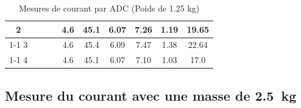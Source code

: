 \begin{table}[H]
{\begin{tabular}{|c|c|c|c|c|c|c|c|c|c|}
            2         &                                                            &                           &                                                                                        & 4.6                                                      & 45.1                                                    & 6.07                                                                & 7.26                                                  & 1.19   & 19.65                                                              \\ \cline{1-1} \cline{5-10}
            3         &                                                            &                           &                                                                                        & 4.6                                                      & 45.4                                                    & 6.09                                                                & 7.47                                                  & 1.38   & 22.64                                                              \\ \cline{1-1} \cline{5-10}
            4         &                                                            &                           &                                                                                        & 4.6                                                      & 45.1                                                    & 6.07                                                                & 7.10                                                  & 1.03   & 17.0                                                               \\ \hline
        \end{tabular}%
    }
    \caption{Mesures de courant par ADC (Poids de 1.25 kg)}
    \label{tab:poids_1_25_adc}
\end{table}

\subsection{Mesure du courant avec une masse de 2.5~kg}

